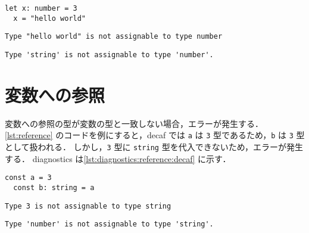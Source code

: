 \begin{lstlisting}[caption=変数への代入の例, label=lst:assignment]
  let x: number = 3
  x = "hello world"
\end{lstlisting}

\begin{minipage}{0.45\textwidth}
    \begin{lstlisting}[caption=decaf の diagnostics, label=lst:diagnostics:assignment:decaf]
    Type "hello world" is not assignable to type number
  \end{lstlisting}
\end{minipage}
\hfill
\begin{minipage}{0.45\textwidth}
    \begin{lstlisting}[caption=tsc の diagnostics, label=lst:diagnostics:assignment:tsc]
    Type 'string' is not assignable to type 'number'.
  \end{lstlisting}
\end{minipage}

\section{変数への参照}

変数への参照の型が変数の型と一致しない場合，エラーが発生する．
\ref{lst:reference} のコードを例にすると，decaf では \texttt{a} は \texttt{3} 型であるため，\texttt{b} は \texttt{3} 型として扱われる．
しかし，\texttt{3} 型に \texttt{string} 型を代入できないため，エラーが発生する．
diagnostics は\ref{lst:diagnostics:reference:decaf} に示す．

\begin{lstlisting}[caption=変数への参照の例, label=lst:reference]
  const a = 3
  const b: string = a
\end{lstlisting}

\begin{minipage}{0.45\textwidth}
    \begin{lstlisting}[caption=decaf の diagnostics, label=lst:diagnostics:reference:decaf]
    Type 3 is not assignable to type string
  \end{lstlisting}
\end{minipage}
\hfill
\begin{minipage}{0.45\textwidth}
    \begin{lstlisting}[caption=tsc の diagnostics, label=lst:diagnostics:reference:tsc]
    Type 'number' is not assignable to type 'string'.
  \end{lstlisting}
\end{minipage}

